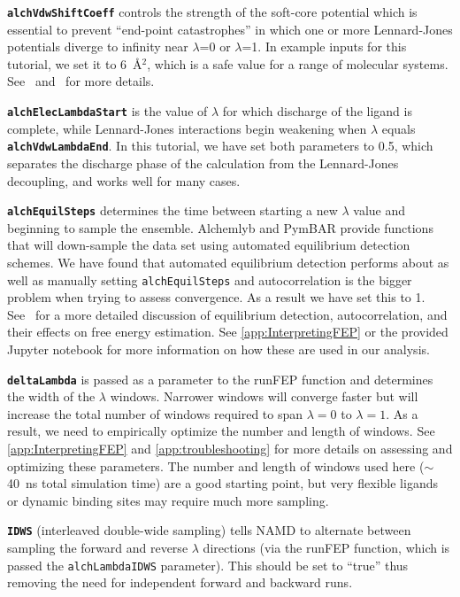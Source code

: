 \documentclass[9pt,tutorial,pubversion]{Styling/livecoms}
\newcommand{\textInput}[1]{\texttt{#1}}
\begin{document}
\textbf{\textInput{alchVdwShiftCoeff}} controls the strength of the soft-core potential which is essential to prevent “end-point catastrophes” in which one or more Lennard-Jones potentials diverge to infinity near $\lambda$=0 or $\lambda$=1.
In example inputs for this tutorial, we set it to 6~\AA$^2$, which is a safe value for a range of molecular systems. See~\cite{Zacharias1994} and~\cite{Ebrahimi2022} for more details.

\textbf{\textInput{alchElecLambdaStart}} is the value of $\lambda$ for which discharge of the ligand is complete, while Lennard-Jones interactions begin weakening when $\lambda$ equals \textbf{\textInput{alchVdwLambdaEnd}}. 
In this tutorial, we have set both parameters to 0.5, which separates the discharge phase of the calculation from the Lennard-Jones decoupling, and works well for many cases. 

\textbf{\textInput{alchEquilSteps}} determines the time between starting a new $\lambda$ value and beginning to sample the ensemble. Alchemlyb and PymBAR provide functions that will down-sample the data set using automated equilibrium detection schemes. We have found that automated equilibrium detection performs about as well as manually setting \textInput{alchEquilSteps} and autocorrelation is the bigger problem when trying to assess convergence. As a result we have set this to 1. See~\cite{shirts2008statistically} for a more detailed discussion of equilibrium detection, autocorrelation, and their effects on free energy estimation. See \ref{app:InterpretingFEP} or the provided Jupyter notebook for more information on how these are used in our analysis.

\textbf{\textInput{deltaLambda}} is passed as a parameter to the runFEP function and determines the width of the $\lambda$ windows. Narrower windows will converge faster but will increase the total number of windows required to span $\lambda=0$ to $\lambda=1$. 
As a result, we need to empirically optimize the number and length of windows. 
See \ref{app:InterpretingFEP} and \ref{app:troubleshooting} for more details on assessing and optimizing these parameters. 
The number and length of windows used here ($\sim$ 40~ns total simulation time) are a good starting point, but very flexible ligands or dynamic binding sites may require much more sampling.   

\textbf{\textInput{IDWS}} (interleaved double-wide sampling) 
tells NAMD to alternate between sampling the forward and reverse $\lambda$ directions (via the runFEP function, which is passed the \textInput{alchLambdaIDWS} parameter). This should be set to ``true'' thus removing the need for independent forward and backward runs.
\end{document}
